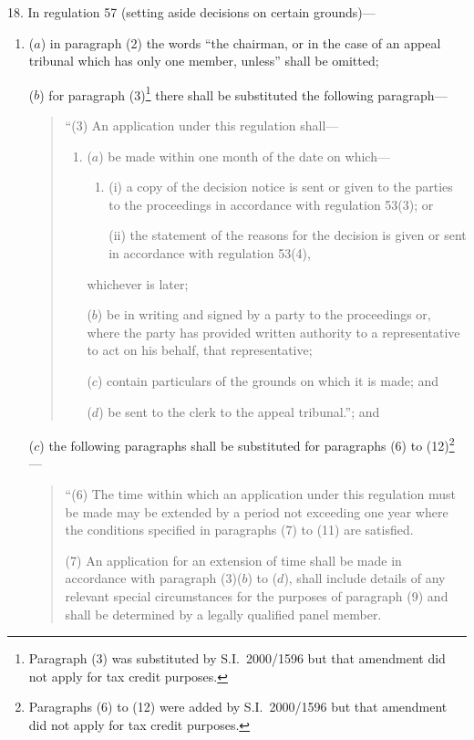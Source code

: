 \documentclass[12pt,a4paper]{article}
\begin{document}
18.  In regulation 57 (setting aside decisions on certain grounds)—
\begin{enumerate}\item[]
($a$) in paragraph (2) the words “the chairman, or in the case of an appeal tribunal which has only one member, unless” shall be omitted;

($b$) for paragraph (3)\footnote{Paragraph (3) was substituted by S.I.\ 2000/1596 but that amendment did not apply for tax credit purposes.} there shall be substituted the following paragraph—
\begin{quotation}
“(3) An application under this regulation shall—
\begin{enumerate}\item[]
($a$) be made within one month of the date on which—
\begin{enumerate}\item[]
(i) a copy of the decision notice is sent or given to the parties to the proceedings in accordance with regulation 53(3); or

(ii) the statement of the reasons for the decision is given or sent in accordance with regulation 53(4),
\end{enumerate}
whichever is later;

($b$) be in writing and signed by a party to the proceedings or, where the party has provided written authority to a representative to act on his behalf, that representative;

($c$) contain particulars of the grounds on which it is made; and

($d$) be sent to the clerk to the appeal tribunal.”; and
\end{enumerate}
\end{quotation}

($c$) the following paragraphs shall be substituted for paragraphs (6) to (12)\footnote{Paragraphs (6) to (12) were added by S.I.\ 2000/1596 but that amendment did not apply for tax credit purposes.}—
\begin{quotation}
“(6) The time within which an application under this regulation must be made may be extended by a period not exceeding one year where the conditions specified in paragraphs (7) to (11) are satisfied.

(7) An application for an extension of time shall be made in accordance with paragraph (3)($b$)  to ($d$), shall include details of any relevant special circumstances for the purposes of paragraph (9) and shall be determined by a legally qualified panel member.


\end{quotation}
\end{enumerate}
\end{document}
